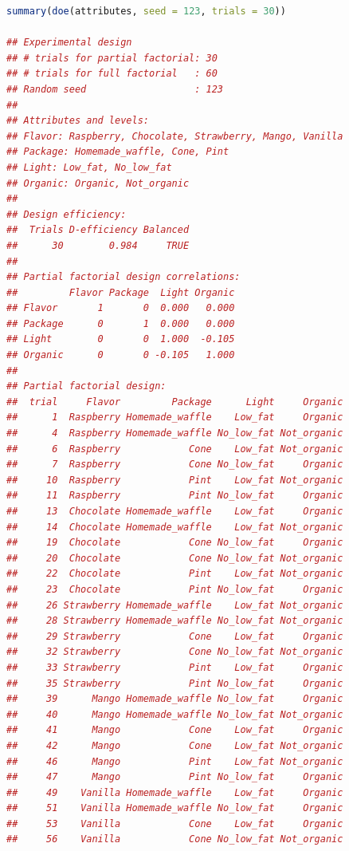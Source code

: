 \documentclass{article}
\begin{document}
\begin{lstlisting}[language=R]
summary(doe(attributes, seed = 123, trials = 30))

## Experimental design
## # trials for partial factorial: 30 
## # trials for full factorial   : 60 
## Random seed                   : 123 
## 
## Attributes and levels:
## Flavor: Raspberry, Chocolate, Strawberry, Mango, Vanilla 
## Package: Homemade_waffle, Cone, Pint 
## Light: Low_fat, No_low_fat 
## Organic: Organic, Not_organic 
## 
## Design efficiency:
##  Trials D-efficiency Balanced
##      30        0.984     TRUE
## 
## Partial factorial design correlations:
##         Flavor Package  Light Organic
## Flavor       1       0  0.000   0.000
## Package      0       1  0.000   0.000
## Light        0       0  1.000  -0.105
## Organic      0       0 -0.105   1.000
## 
## Partial factorial design:
##  trial     Flavor         Package      Light     Organic
##      1  Raspberry Homemade_waffle    Low_fat     Organic
##      4  Raspberry Homemade_waffle No_low_fat Not_organic
##      6  Raspberry            Cone    Low_fat Not_organic
##      7  Raspberry            Cone No_low_fat     Organic
##     10  Raspberry            Pint    Low_fat Not_organic
##     11  Raspberry            Pint No_low_fat     Organic
##     13  Chocolate Homemade_waffle    Low_fat     Organic
##     14  Chocolate Homemade_waffle    Low_fat Not_organic
##     19  Chocolate            Cone No_low_fat     Organic
##     20  Chocolate            Cone No_low_fat Not_organic
##     22  Chocolate            Pint    Low_fat Not_organic
##     23  Chocolate            Pint No_low_fat     Organic
##     26 Strawberry Homemade_waffle    Low_fat Not_organic
##     28 Strawberry Homemade_waffle No_low_fat Not_organic
##     29 Strawberry            Cone    Low_fat     Organic
##     32 Strawberry            Cone No_low_fat Not_organic
##     33 Strawberry            Pint    Low_fat     Organic
##     35 Strawberry            Pint No_low_fat     Organic
##     39      Mango Homemade_waffle No_low_fat     Organic
##     40      Mango Homemade_waffle No_low_fat Not_organic
##     41      Mango            Cone    Low_fat     Organic
##     42      Mango            Cone    Low_fat Not_organic
##     46      Mango            Pint    Low_fat Not_organic
##     47      Mango            Pint No_low_fat     Organic
##     49    Vanilla Homemade_waffle    Low_fat     Organic
##     51    Vanilla Homemade_waffle No_low_fat     Organic
##     53    Vanilla            Cone    Low_fat     Organic
##     56    Vanilla            Cone No_low_fat Not_organic

\end{lstlisting}
\end{document}
